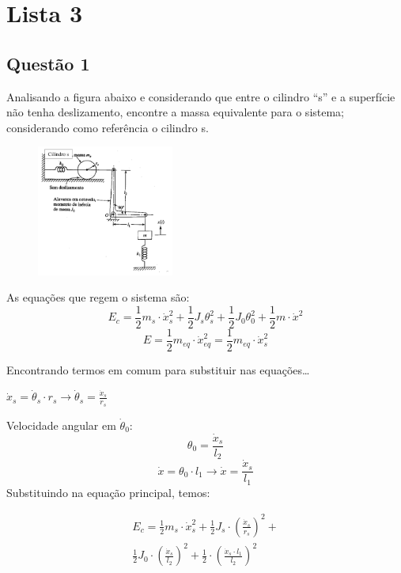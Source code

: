 \section{Lista 3}
\subsection{Questão 1}
Analisando a figura abaixo e considerando que entre o cilindro ``s'' e a
superfície não tenha deslizamento, encontre a massa equivalente para o sistema;
considerando como referência o cilindro s.

\begin{figure}[ht]
    \centering
    \includegraphics[width=0.4\textwidth]{imagens/lista_3_questao_1.png}
    \label{fig:questao1}
\end{figure}

\resol
As equações que regem o sistema são:
\[
    E_c = \frac{1}{2}m_{s}\cdot {\dot{x}_{s}^2} + \frac{1}{2}J_{s}\theta_{s}^2 + \frac{1}{2}J_0\theta_{0}^2 + \frac{1}{2}m\cdot \dot{x}^2
\]
\[
    E = \frac{1}{2}m_{eq}\cdot \dot{x}_{eq}^2 = \frac{1}{2}m_{eq}\cdot \dot{x}_s^2
\]

Encontrando termos em comum para substituir nas equações\ldots

$\dot{x}_s = \dot{\theta}_s \cdot r_s \to \dot{\theta}_s = \frac{\dot{x}_s}{r_s}$

Velocidade angular em $\dot{\theta}_0$:
\[
    \theta_0 = \frac{\dot{x}_s}{l_2}
\]
\[
    \dot x = \theta_0 \cdot l_1 \to \dot x = \frac{\dot{x}_s}{l_1}
\]
Substituindo na equação principal, temos:

\[
    \begin{multlined}
    E_c = \frac{1}{2}m_s\cdot \dot{x}_s^2 + \frac{1}{2}J_s\cdot \left(
    \frac{\dot{x}_s}{r_s} \right)^2 +\\ \frac{1}{2}J_0\cdot \left( \frac{\dot {x}_s}{l_2} \right)^2 + \frac{1}{2}\cdot \left( \frac{\dot {x}_s\cdot l_1}{l_2} \right)^2
    \end{multlined}
\]

